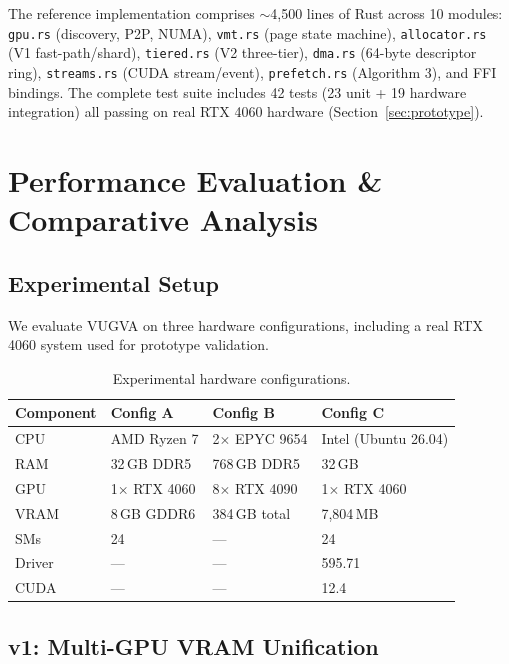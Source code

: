\documentclass[11pt,twocolumn]{article}
\begin{document}
The reference implementation comprises $\sim$4,500 lines of Rust across 10 modules: \texttt{gpu.rs} (discovery, P2P, NUMA), \texttt{vmt.rs} (page state machine), \texttt{allocator.rs} (V1 fast-path/shard), \texttt{tiered.rs} (V2 three-tier), \texttt{dma.rs} (64-byte descriptor ring), \texttt{streams.rs} (CUDA stream/event), \texttt{prefetch.rs} (Algorithm 3), and FFI bindings. The complete test suite includes 42 tests (23 unit + 19 hardware integration) all passing on real RTX 4060 hardware (Section~\ref{sec:prototype}).

\section{Performance Evaluation \& Comparative Analysis}
\label{sec:evaluation}

\subsection{Experimental Setup}

We evaluate VUGVA on three hardware configurations, including a real RTX 4060 system used for prototype validation.

\begin{table}[ht]
\centering
\caption{Experimental hardware configurations.}
\label{tab:setup}
\small
\begin{tabular}{llll}
\toprule
\textbf{Component} & \textbf{Config A} & \textbf{Config B} & \textbf{Config C} \\
\midrule
CPU & AMD Ryzen 7 & 2$\times$ EPYC 9654 & Intel (Ubuntu 26.04) \\
RAM & 32\,GB DDR5 & 768\,GB DDR5 & 32\,GB \\
GPU & 1$\times$ RTX 4060 & 8$\times$ RTX 4090 & 1$\times$ RTX 4060 \\
VRAM & 8\,GB GDDR6 & 384\,GB total & 7,804\,MB \\
SMs & 24 & --- & 24 \\
Driver & --- & --- & 595.71 \\
CUDA & --- & --- & 12.4 \\
\bottomrule
\end{tabular}
\end{table}

\subsection{v1: Multi-GPU VRAM Unification}
\end{document}
